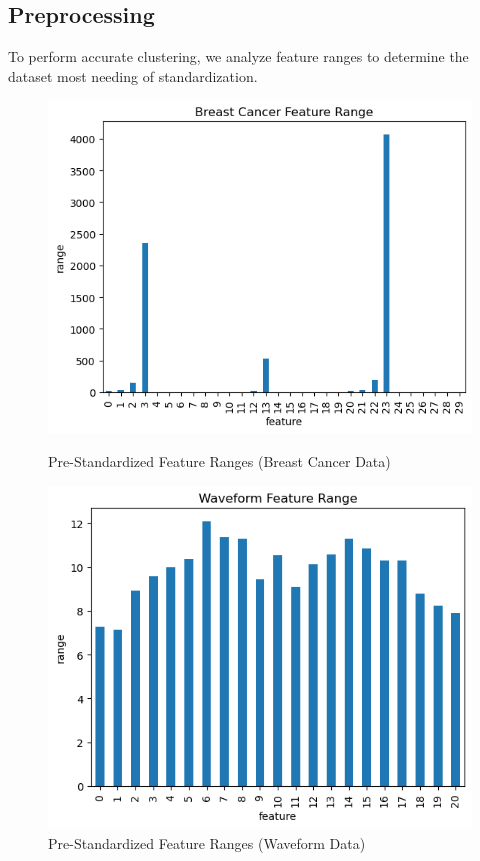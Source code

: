 \documentclass{article}
\begin{document}
\subsection{Preprocessing}
To perform accurate clustering, we analyze feature ranges to determine the dataset most needing of standardization.
\begin{figure}[H]
    \centering
    \begin{minipage}[b]{0.49\textwidth}
        \centering
        \includegraphics[width=\textwidth]{p_i.png}
        \caption{Pre-Standardized Feature Ranges (Breast Cancer Data)}
    \end{minipage}
    \hfill
    \begin{minipage}[b]{0.49\textwidth}
        \centering
        \includegraphics[width=\textwidth]{p_ii.png}
        \caption{Pre-Standardized Feature Ranges (Waveform Data)}
    \end{minipage}
\end{figure}
\end{document}

